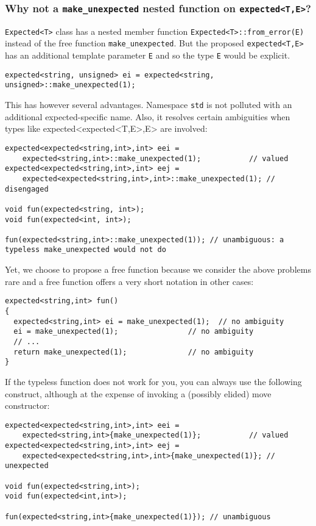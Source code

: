 \documentclass[a4paper,10pt]{article}
\newcommand{\cpp}[1]{\lstinline{#1}}
\begin{document}
\subsubsection{Why not a \cpp{make_unexpected} nested function on \cpp{expected<T,E>}?}

\cite{AlexandrescuExpected} \cpp{Expected<T>} class has a nested member function \cpp{Expected<T>::from_error(E)} instead of the free function \cpp{make_unexpected}. But the proposed \cpp{expected<T,E>} has an additional template parameter \cpp{E} and so the type \cpp{E} would be explicit.

\begin{lstlisting}
expected<string, unsigned> ei = expected<string, unsigned>::make_unexpected(1);
\end{lstlisting}

This has however several advantages. Namespace \cpp{std} is not polluted with an additional expected-specific name. Also, it resolves certain ambiguities when types like expected<expected<T,E>,E> are involved:

\begin{lstlisting}
expected<expected<string,int>,int> eei = 
    expected<string,int>::make_unexpected(1);           // valued
expected<expected<string,int>,int> eej = 
    expected<expected<string,int>,int>::make_unexpected(1); // disengaged

void fun(expected<string, int>);
void fun(expected<int, int>);

fun(expected<string,int>::make_unexpected(1)); // unambiguous: a typeless make_unexpected would not do 
\end{lstlisting}

Yet, we choose to propose a free function because we consider the above problems rare and a free function offers a very short notation in other cases:

\begin{lstlisting}
expected<string,int> fun()
{
  expected<string,int> ei = make_unexpected(1);  // no ambiguity
  ei = make_unexpected(1);                // no ambiguity
  // ...
  return make_unexpected(1);              // no ambiguity
}
\end{lstlisting}

If the typeless function does not work for you, you can always use the following construct, although at the expense of invoking a (possibly elided) move constructor:

\begin{lstlisting}
expected<expected<string,int>,int> eei = 
    expected<string,int>{make_unexpected(1)};           // valued
expected<expected<string,int>,int> eej = 
    expected<expected<string,int>,int>{make_unexpected(1)}; // unexpected

void fun(expected<string,int>);
void fun(expected<int,int>);

fun(expected<string,int>{make_unexpected(1)}); // unambiguous 
\end{lstlisting}
\end{document}

